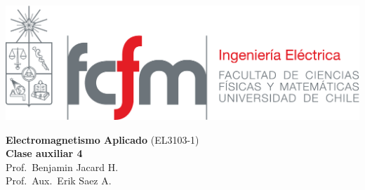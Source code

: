 \documentclass[
  11pt,
  letterpaper,
   addpoints,
   answers
  ]{exam}
\begin{document}
\noindent
\begin{minipage}{0.47\textwidth}
\includegraphics[width=\textwidth]{../fcfm_die}
\end{minipage}
\begin{minipage}{0.53\textwidth}
\begin{center} 
\large\textbf{Electromagnetismo Aplicado} (EL3103-1) \\
\large\textbf{Clase auxiliar 4} \\
\normalsize Prof.~Benjamin Jacard H.\\
\normalsize Prof.~Aux.~Erik Saez A.
\end{center}
\end{minipage}

\vspace{0.5cm}
\noindent
\vspace{.85cm}
\end{document}
